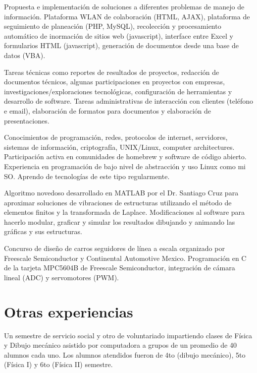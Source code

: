 \documentclass[11pt,a4paper,sans]{moderncv}	%
\begin{document}
{Propuesta e implementación de soluciones a diferentes problemas de manejo de información. Plataforma WLAN de colaboración (HTML, AJAX), plataforma de seguimiento de planeación (PHP, MySQL), recolección y procesamiento automático de inormación de sitios web (javascript), interface entre Excel y formularios HTML (javascript), generación de documentos desde una base de datos (VBA).}

{Tareas técnicas como reportes de resultados de proyectos, redacción de documentos técnicos, algunas participaciones en proyectos con empresas, investigaciones/exploraciones tecnológicas, configuración de herramientas y desarrollo de software. Tareas administrativas de interacción con clientes (teléfono e email), elaboración de formatos para documentos y elaboración de presentaciones.}

{Conocimientos de programación, redes, protocolos de internet, servidores, sistemas de información, criptografía, UNIX/Linux, computer architectures. Participación activa en comunidades de homebrew y software de código abierto. Experiencia en programación de bajo nivel de abstracción y uso Linux como mi SO. Aprendo de tecnologías de este tipo regularmente.}

{Algoritmo novedoso desarrollado en MATLAB por el Dr. Santiago Cruz para aproximar soluciones de vibraciones de estructuras utilizando el método de elementos finitos y la transformada de Laplace. Modificaciones al software para hacerlo modular, graficar y simular los resultados dibujando y animando las gráficas y sus estructuras.}

{Concurso de diseño de carros seguidores de línea a escala organizado por Freescale Semiconductor y Continental Automotive Mexico. Programación en C de la tarjeta MPC5604B de Freescale Semiconductor, integración de cámara lineal (ADC) y servomotores (PWM).}

\section{Otras experiencias}
{Un semestre de servicio social y otro de voluntariado impartiendo clases de Física y Dibujo mecánico asistido por computadora a grupos de un promedio de 40 alumnos cada uno. Los alumnos atendidos fueron de 4to (dibujo mecánico), 5to (Física I) y 6to (Física II) semestre.}
\end{document}
